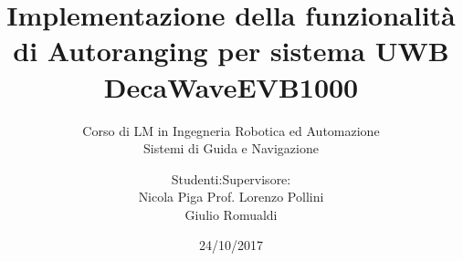 \documentclass{beamer}
\date{24/10/2017}
\title[]{Implementazione della funzionalità di Autoranging per sistema UWB DecaWaveEVB1000}
\subtitle{Corso di LM in Ingegneria Robotica ed Automazione \\
  Sistemi di Guida e Navigazione}
\author{Studenti:\hfill Supervisore:\\
Nicola Piga \hfill Prof. Lorenzo Pollini\\
Giulio Romualdi}
\institute[]{Università di Pisa}
\begin{document}

\begin{frame}
  \maketitle
\end{frame}
















\end{document}
